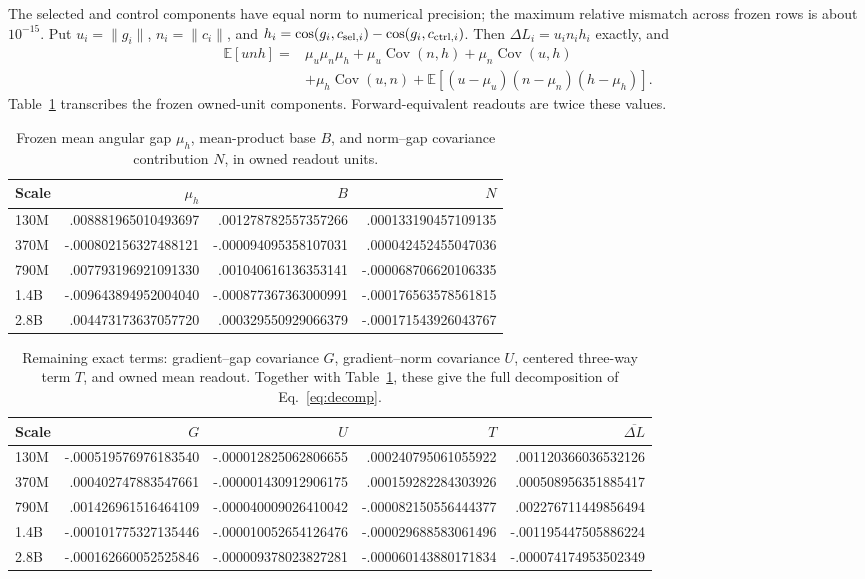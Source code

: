 The selected and control components have equal norm to numerical
precision; the maximum relative mismatch across frozen rows is about
$10^{-15}$. Put $u_i=\|g_i\|$, $n_i=\|c_i\|$, and
$h_i=\cos(g_i,c_{{\rm sel},i})-\cos(g_i,c_{{\rm ctrl},i})$.
Then $\Delta L_i=u_i n_i h_i$ exactly, and
\begin{align}
\mathbb{E}[unh]={}&\mu_u\mu_n\mu_h+
\mu_u\operatorname{Cov}(n,h)+
\mu_n\operatorname{Cov}(u,h)\nonumber\\
&+\mu_h\operatorname{Cov}(u,n)+
\mathbb{E}[(u-\mu_u)(n-\mu_n)(h-\mu_h)].
\label{eq:decomp}
\end{align}
Table~\ref{tab:decomp} transcribes the frozen owned-unit components.
Forward-equivalent readouts are twice these values.

\begin{table}[h]
\centering\scriptsize
\caption{Frozen mean angular gap $\mu_h$, mean-product base $B$, and
norm--gap covariance contribution $N$, in owned readout units.}
\label{tab:decomp}
\begin{tabular}{lrrr}
\toprule
Scale & $\mu_h$ & $B$ & $N$ \\
\midrule
130M & .008881965010493697 & .001278782557357266 & .000133190457109135 \\
370M & -.000802156327488121 & -.000094095358107031 & .000042452455047036 \\
790M & .007793196921091330 & .001040616136353141 & -.000068706620106335 \\
1.4B & -.009643894952004040 & -.000877367363000991 & -.000176563578561815 \\
2.8B & .004473173637057720 & .000329550929066379 & -.000171543926043767 \\
\bottomrule
\end{tabular}
\end{table}

\begin{table}[h]
\centering\scriptsize
\caption{Remaining exact terms: gradient--gap covariance $G$,
gradient--norm covariance $U$, centered three-way term $T$, and owned
mean readout. Together with Table~\ref{tab:decomp}, these give the full
decomposition of Eq.~\ref{eq:decomp}.}
\begin{tabular}{lrrrr}
\toprule
Scale & $G$ & $U$ & $T$ & $\overline{\Delta L}$ \\
\midrule
130M & -.000519576976183540 & -.000012825062806655 & .000240795061055922 & .001120366036532126 \\
370M & .000402747883547661 & -.000001430912906175 & .000159282284303926 & .000508956351885417 \\
790M & .001426961516464109 & -.000040009026410042 & -.000082150556444377 & .002276711449856494 \\
1.4B & -.000101775327135446 & -.000010052654126476 & -.000029688583061496 & -.001195447505886224 \\
2.8B & -.000162660052525846 & -.000009378023827281 & -.000060143880171834 & -.000074174953502349 \\
\bottomrule
\end{tabular}
\end{table}

